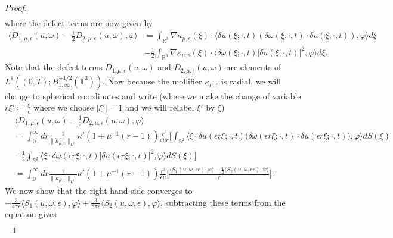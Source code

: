 \documentclass[12pt,a4paper]{article}
\theoremstyle{definition}
\theoremstyle{remark}
\numberwithin{equation}{section}
\begin{document}
\begin{proof}
\begin{align}
\end{align}
where the defect terms are now given by
\begin{align*}
\bigg\langle D_{1,\mu,\epsilon} (u, \omega) - \frac{1}{2} D_{2,\mu,\epsilon} (u, \omega), \varphi \bigg\rangle &= \int_{\mathbb{R}^3} \nabla \kappa_{\mu,\epsilon} (\xi) \cdot \big\langle \delta u (\xi ; \cdot, t) (\delta \omega (\xi ; \cdot, t) \cdot \delta u (\xi ; \cdot, t) ), \varphi \big\rangle d \xi \\
&- \frac{1}{2} \int_{\mathbb{R}^3} \nabla \kappa_{\mu,\epsilon} (\xi) \cdot \big\langle \delta \omega (\xi ; \cdot, t) \lvert \delta u (\xi ; \cdot, t) \rvert^2, \varphi \big\rangle d \xi.
\end{align*}
Note that the defect terms $D_{1,\mu,\epsilon} (u, \omega)$ and $D_{2,\mu,\epsilon} (u, \omega)$ are elements of $L^1 ((0,T);B^{-1/2}_{1,\infty} (\mathbb{T}^3))$. Now because the mollifier $\kappa_{\mu,\epsilon}$ is radial, we will change to spherical coordinates and write (where we make the change of variable $r \xi' \coloneqq \frac{\xi}{\epsilon}$ where we choose $\lvert \xi' \rvert = 1$ and we will relabel $\xi'$ by $\xi$)
\begin{align*}
&\bigg\langle D_{1,\mu,\epsilon} (u, \omega) - \frac{1}{2} D_{2,\mu,\epsilon} (u, \omega), \varphi \bigg\rangle \\
&= \int_{0}^\infty dr \frac{1}{\lVert \widetilde{\kappa}_{\mu,1} \rVert_{L^1}} \kappa' ( 1 + \mu^{-1} (r -1) ) \frac{r^3}{\epsilon \mu r} \bigg[ \int_{\mathbb{S}^2} \big\langle \xi \cdot \delta u (\epsilon r \xi ; \cdot,t) \big(\delta \omega (\epsilon r \xi ;\cdot,t) \cdot \delta u (\epsilon r \xi ; \cdot, t) \big), \varphi \big\rangle d S (\xi) \\
&- \frac{1}{2} \int_{\mathbb{S}^2} \big\langle \xi \cdot \delta \omega (\epsilon r \xi ; \cdot,t) \lvert \delta u (\epsilon r \xi ;\cdot,t) \rvert^2, \varphi \big\rangle d S (\xi) \bigg] \\
&= \int_0^\infty dr \frac{1}{\lVert \widetilde{\kappa}_{\mu,1} \rVert_{L^1}} \kappa' ( 1 + \mu^{-1} (r -1) ) \frac{r^3}{\epsilon \mu} \bigg[ \frac{\langle S_1 (u,\omega, \epsilon r), \varphi \rangle - \frac{1}{2} \langle S_2 (u,\omega, \epsilon r), \varphi \rangle}{r} \bigg].
\end{align*}
We now show that the right-hand side converges to $- \frac{3}{4 \pi \epsilon} \langle S_1 (u,\omega, \epsilon), \varphi \rangle + \frac{3}{8 \pi \epsilon} \langle S_2 (u,\omega, \epsilon), \varphi \rangle$, subtracting these terms from the equation gives
\begin{align*}

\end{align*}
\end{proof}
\end{document}
